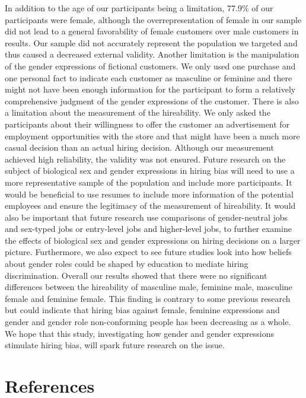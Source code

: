 \documentclass[english,man]{apa6}
\theoremstyle{definition}
\theoremstyle{definition}
\theoremstyle{remark}
\begin{document}
In addition to the age of our participants being a limitation, 77.9\% of
our participants were female, although the overrepresentation of female
in our sample did not lead to a general favorability of female customers
over male customers in results. Our sample did not accurately represent
the population we targeted and thus caused a decreased external
validity. Another limitation is the manipulation of the gender
expressions of fictional customers. We only used one purchase and one
personal fact to indicate each customer as masculine or feminine and
there might not have been enough information for the participant to form
a relatively comprehensive judgment of the gender expressions of the
customer. There is also a limitation about the measurement of the
hireability. We only asked the participants about their willingness to
offer the customer an advertisement for employment opportunities with
the store and that might have been a much more casual decision than an
actual hiring decision. Although our measurement achieved high
reliability, the validity was not ensured. Future research on the
subject of biological sex and gender expressions in hiring bias will
need to use a more representative sample of the population and include
more participants. It would be beneficial to use resumes to include more
information of the potential employees and ensure the legitimacy of the
measurement of hireability. It would also be important that future
research use comparisons of gender-neutral jobs and sex-typed jobs or
entry-level jobs and higher-level jobs, to further examine the effects
of biological sex and gender expressions on hiring decisions on a larger
picture. Furthermore, we also expect to see future studies look into how
beliefs about gender roles could be shaped by education to mediate
hiring discrimination. Overall our results showed that there were no
significant differences between the hireability of masculine male,
feminine male, masculine female and feminine female. This finding is
contrary to some previous research but could indicate that hiring bias
against female, feminine expressions and gender and gender role
non-conforming people has been decreasing as a whole. We hope that this
study, investigating how gender and gender expressions stimulate hiring
bias, will spark future research on the issue.

\newpage

\section{References}\label{references}
\end{document}
